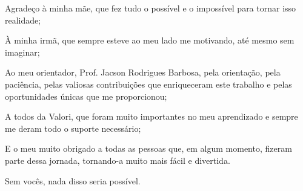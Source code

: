 \begin{agradecimentos}
Agradeço à minha mãe, que fez tudo o possível e o impossível para
tornar isso realidade;

À minha irmã, que sempre esteve ao meu lado me motivando, até
mesmo sem imaginar;

Ao meu orientador, Prof. Jacson Rodrigues Barbosa, pela orientação, pela paciência, pelas valiosas contribuições que enriqueceram este trabalho e pelas oportunidades únicas que me proporcionou;

A todos da Valori, que foram muito importantes no meu aprendizado e sempre me deram todo o suporte necessário;

E o meu muito obrigado a todas as pessoas que, em algum momento, fizeram parte dessa jornada, tornando-a muito mais fácil e divertida.

Sem vocês, nada disso seria possível.
\end{agradecimentos}
